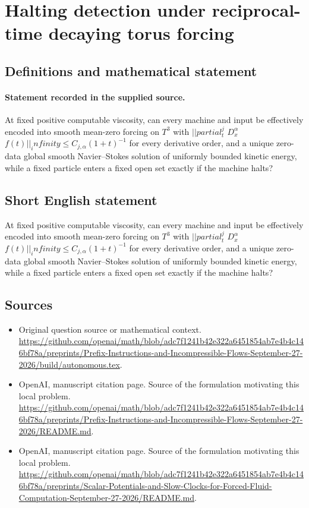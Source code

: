 \documentclass[11pt]{article}
\begin{document}
\section*{Halting detection under reciprocal-time decaying torus forcing}\label{30007335}
\subsection{Definitions and mathematical statement}
\paragraph{Statement recorded in the supplied source.}
At fixed positive computable viscosity, can every machine and input be effectively encoded into smooth mean-zero forcing on $T^3$ with $||partial_t^j$ $D_x^\alpha $ $f(t)||_infinity\leq C_{j,\alpha }(1+t)^{-1}$ for every derivative order, and a unique zero-data global smooth Navier–Stokes solution of uniformly bounded kinetic energy, while a fixed particle enters a fixed open set exactly if the machine halts?
\subsection{Short English statement}
At fixed positive computable viscosity, can every machine and input be effectively encoded into smooth mean-zero forcing on $T^3$ with $||partial_t^j$ $D_x^\alpha $ $f(t)||_infinity\leq C_{j,\alpha }(1+t)^{-1}$ for every derivative order, and a unique zero-data global smooth Navier–Stokes solution of uniformly bounded kinetic energy, while a fixed particle enters a fixed open set exactly if the machine halts?
\subsection{Sources}
\begin{itemize}
\item[S1] Original question source or mathematical context.
\url{https://github.com/openai/math/blob/adc7f1241b42e322a6451854ab7e4b4c146bf78a/preprints/Prefix-Instructions-and-Incompressible-Flows-September-27-2026/build/autonomous.tex}.
\item[S2] OpenAI, manuscript citation page. Source of the formulation motivating this local problem.
\url{https://github.com/openai/math/blob/adc7f1241b42e322a6451854ab7e4b4c146bf78a/preprints/Prefix-Instructions-and-Incompressible-Flows-September-27-2026/README.md}.
\item[S3] OpenAI, manuscript citation page. Source of the formulation motivating this local problem.
\url{https://github.com/openai/math/blob/adc7f1241b42e322a6451854ab7e4b4c146bf78a/preprints/Scalar-Potentials-and-Slow-Clocks-for-Forced-Fluid-Computation-September-27-2026/README.md}.
\end{itemize}
\end{document}
